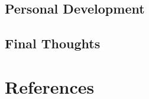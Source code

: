 \documentclass[12pt, a4paper]{article}
\begin{document}

\subsection{Personal Development}


\subsection{Final Thoughts}

\pagebreak


\section{References}


\end{document}
